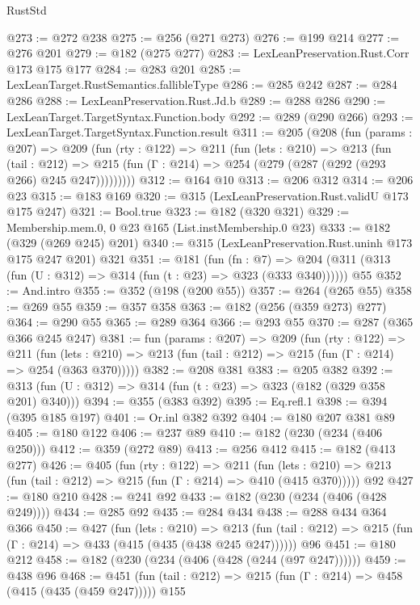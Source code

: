 \begin{lexlean}{RustStd}
\begin{coremodule}
@273 := @272 @238
@275 := @256 (@271 @273)
@276 := @199 @214
@277 := @276 @201
@279 := @182 (@275 @277)
@283 := LexLeanPreservation.Rust.Corr @173 @175 @177
@284 := @283 @201
@285 := LexLeanTarget.RustSemantics.fallibleType
@286 := @285 @242
@287 := @284 @286
@288 := LexLeanPreservation.Rust.Jd.b
@289 := @288 @286
@290 := LexLeanTarget.TargetSyntax.Function.body
@292 := @289 (@290 @266)
@293 := LexLeanTarget.TargetSyntax.Function.result
@311 := @205
    (@208
      (fun (params : @207) =>
      @209
        (fun (rty : @122) =>
        @211
          (fun (lets : @210) =>
          @213
            (fun (tail : @212) =>
            @215 (fun (Γ : @214) => @254 (@279 (@287 (@292 (@293 @266) @245 @247)))))))))
@312 := @164 @10
@313 := @206 @312
@314 := @206 @23
@315 := @183 @169
@320 := @315 (LexLeanPreservation.Rust.validU @173 @175 @247)
@321 := Bool.true
@323 := @182 (@320 @321)
@329 := Membership.mem.{0, 0} @23 @165 (List.instMembership.{0} @23)
@333 := @182 (@329 (@269 @245) @201)
@340 := @315 (LexLeanPreservation.Rust.uninh @173 @175 @247 @201) @321
@351 := @181
    (fun (fn : @7) =>
    @204 (@311 (@313 (fun (U : @312) => @314 (fun (t : @23) => @323 (@333 @340))))))
    @55
@352 := And.intro
@355 := @352 (@198 (@200 @55))
@357 := @264 (@265 @55)
@358 := @269 @55
@359 := @357 @358
@363 := @182 (@256 (@359 @273) @277)
@364 := @290 @55
@365 := @289 @364
@366 := @293 @55
@370 := @287 (@365 @366 @245 @247)
@381 := fun (params : @207) =>
  @209
    (fun (rty : @122) =>
    @211
      (fun (lets : @210) => @213 (fun (tail : @212) => @215 (fun (Γ : @214) => @254 (@363 @370)))))
@382 := @208 @381
@383 := @205 @382
@392 := @313 (fun (U : @312) => @314 (fun (t : @23) => @323 (@182 (@329 @358 @201) @340)))
@394 := @355 (@383 @392)
@395 := Eq.refl.{1}
@398 := @394 (@395 @185 @197)
@401 := Or.inl @382 @392
@404 := @180 @207 @381 @89
@405 := @180 @122
@406 := @237 @89
@410 := @182 (@230 (@234 (@406 @250)))
@412 := @359 (@272 @89)
@413 := @256 @412
@415 := @182 (@413 @277)
@426 := @405
    (fun (rty : @122) =>
    @211
      (fun (lets : @210) => @213 (fun (tail : @212) => @215 (fun (Γ : @214) => @410 (@415 @370)))))
    @92
@427 := @180 @210
@428 := @241 @92
@433 := @182 (@230 (@234 (@406 (@428 @249))))
@434 := @285 @92
@435 := @284 @434
@438 := @288 @434 @364 @366
@450 := @427
    (fun (lets : @210) =>
    @213 (fun (tail : @212) => @215 (fun (Γ : @214) => @433 (@415 (@435 (@438 @245 @247))))))
    @96
@451 := @180 @212
@458 := @182 (@230 (@234 (@406 (@428 (@244 (@97 @247))))))
@459 := @438 @96
@468 := @451 (fun (tail : @212) => @215 (fun (Γ : @214) => @458 (@415 (@435 (@459 @247))))) @155

\end{coremodule}
\end{lexlean}
